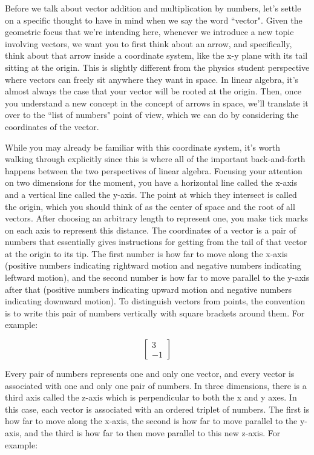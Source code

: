 Before we talk about vector addition and multiplication by numbers, let's settle
on a specific thought to have in mind when we say the word ``vector". Given the
geometric focus that we're intending here, whenever we introduce a new topic
involving vectors, we want you to first think about an arrow, and specifically,
think about that arrow inside a coordinate system, like the x-y plane with its
tail sitting at the origin. This is slightly different from the physics student
perspective where vectors can freely sit anywhere they want in space. In linear
algebra, it's almost always the case that your vector will be rooted at the
origin. Then, once you understand a new concept in the concept of arrows in
space, we'll translate it over to the ``list of numbers" point of view, which we
can do by considering the coordinates of the vector.

While you may already be familiar with this coordinate system, it's worth
walking through explicitly since this is where all of the important
back-and-forth happens between the two perspectives of linear algebra. Focusing
your attention on two dimensions for the moment, you have a horizontal line
called the x-axis and a vertical line called the y-axis. The point at which they
intersect is called the origin, which you should think of as the center of
space and the root of all vectors. After choosing an arbitrary length to
represent one, you make tick marks on each axis to represent this distance. The
coordinates of a vector is a pair of numbers that essentially gives instructions
for getting from the tail of that vector at the origin to its tip. The first
number is how far to move along the x-axis (positive numbers indicating
rightward motion and negative numbers indicating leftward motion), and the
second number is how far to move parallel to the y-axis after that (positive
numbers indicating upward motion and negative numbers indicating downward
motion). To distinguish vectors from points, the convention is to write this
pair of numbers vertically with square brackets around them. For example:

\begin{equation*}
  \begin{bmatrix}
    3 \\
    -1
  \end{bmatrix}
\end{equation*}

Every pair of numbers represents one and only one vector, and every vector is
associated with one and only one pair of numbers. In three dimensions, there is
a third axis called the z-axis which is perpendicular to both the x and y axes.
In this case, each vector is associated with an ordered triplet of numbers. The
first is how far to move along the x-axis, the second is how far to move
parallel to the y-axis, and the third is how far to then move parallel to this
new z-axis. For example:

